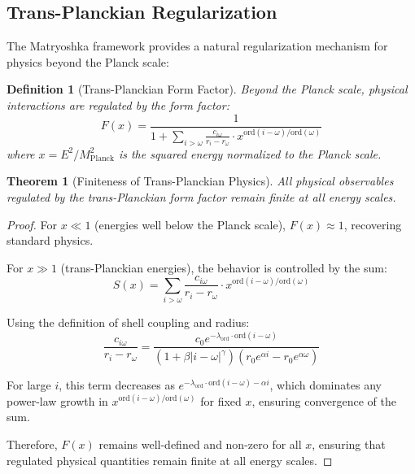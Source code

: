 \documentclass[12pt,a4paper]{article}
\newtheorem{theorem}{Theorem}[section]
\newtheorem{definition}{Definition}[section]
\newcommand{\ord}{\text{ord}}
\begin{document}
\subsection{Trans-Planckian Regularization}
\label{subsec:trans-planckian}

The Matryoshka framework provides a natural regularization mechanism for physics beyond the Planck scale:

\begin{definition}[Trans-Planckian Form Factor]
\label{def:trans-planckian}
Beyond the Planck scale, physical interactions are regulated by the form factor:
\begin{equation}
F(x) = \frac{1}{1 + \sum_{i>\omega} \frac{c_{i\omega}}{r_i - r_{\omega}} \cdot x^{\ord(i-\omega)/\ord(\omega)}}
\end{equation}
where $x = E^2/M_{\text{Planck}}^2$ is the squared energy normalized to the Planck scale.
\end{definition}

\begin{theorem}[Finiteness of Trans-Planckian Physics]
\label{thm:finiteness}
All physical observables regulated by the trans-Planckian form factor remain finite at all energy scales.
\end{theorem}

\begin{proof}
For $x \ll 1$ (energies well below the Planck scale), $F(x) \approx 1$, recovering standard physics.

For $x \gg 1$ (trans-Planckian energies), the behavior is controlled by the sum:
\begin{equation}
S(x) = \sum_{i>\omega} \frac{c_{i\omega}}{r_i - r_{\omega}} \cdot x^{\ord(i-\omega)/\ord(\omega)}
\end{equation}

Using the definition of shell coupling and radius:
\begin{equation}
\frac{c_{i\omega}}{r_i - r_{\omega}} = \frac{c_0 e^{-\lambda_{\ord} \cdot \ord(i-\omega)}}{(1 + \beta |i-\omega|^{\gamma})(r_0 e^{\alpha i} - r_0 e^{\alpha \omega})}
\end{equation}

For large $i$, this term decreases as $e^{-\lambda_{\ord} \cdot \ord(i-\omega) - \alpha i}$, which dominates any power-law growth in $x^{\ord(i-\omega)/\ord(\omega)}$ for fixed $x$, ensuring convergence of the sum.

Therefore, $F(x)$ remains well-defined and non-zero for all $x$, ensuring that regulated physical quantities remain finite at all energy scales.
\end{proof}
\end{document}
